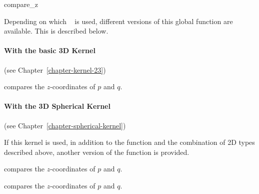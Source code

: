 \begin{ccRefFunction}{compare_z}


Depending on which \cgal\  is used,
different versions of this global function are available. This is
described below.

\paragraph{With the basic 3D Kernel} (see Chapter~\ref{chapter-kernel-23})

        {compares the $z$-coordinates of $p$ and $q$.}

\paragraph{With the 3D Spherical Kernel} (see Chapter~\ref{chapter-spherical-kernel}) 


If this kernel is used, in addition to the function and the
combination of 2D types described above, another version of the function
is provided.

{compares the $z$-coordinates of $p$ and $q$.}

{compares the $z$-coordinates of $p$ and $q$.}

\ccSeeAlso
{} \\
 \\
 \\
 \\
 \\
 \\
 \\

\end{ccRefFunction}

